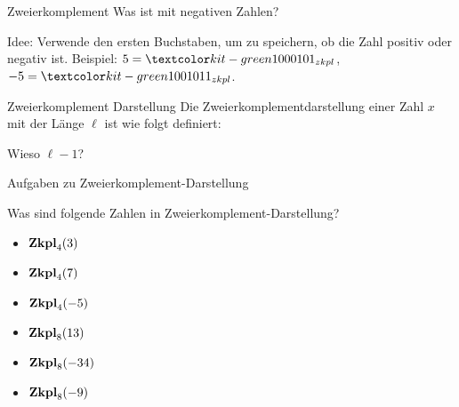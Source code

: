 \documentclass[handout]{beamer}
\begin{document}
\begin{frame}{Zweierkomplement}
\p Was ist mit negativen Zahlen?

\begin{itemize}
\pitem Idee: Verwende den ersten Buchstaben, um zu speichern, ob die Zahl positiv oder negativ ist.
\pitem Beispiel: \p $5 = \markGreen{0}101_{zkpl}$\p , $-5 = \markGreen{1}011_{zkpl}$.
\end{itemize}

\pause

\begin{block}{Zweierkomplement Darstellung}
Die Zweierkomplementdarstellung einer Zahl $x$ \p mit der Länge $\ell$ ist wie folgt definiert:\p
{}		
\end{block}

\begin{itemize}
\pitem Wieso $\ell - 1$?
\end{itemize}

\end{frame}

\begin{frame}{Aufgaben zu Zweierkomplement-Darstellung}

Was sind folgende Zahlen in Zweierkomplement-Darstellung?
\begin{itemize}
\item $\textbf{Zkpl}_4 (3)$ 
\item $\textbf{Zkpl}_4 (7)$ 
\item $\textbf{Zkpl}_4 (-5)$ 
\item $\textbf{Zkpl}_8 (13)$ 
\item $\textbf{Zkpl}_8 (-34)$ 
\item $\textbf{Zkpl}_8 (-9)$ 
\end{itemize}
\end{frame}
\end{document}

